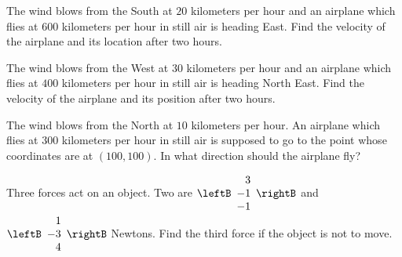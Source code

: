 \begin{enumialphparenastyle}

\begin{ex} The wind blows from the South at $20$ kilometers per hour and an
airplane which flies at $600$ kilometers per hour in still air is heading
East. Find the velocity of the airplane and its location after
two hours. \vspace{1mm}
\end{ex}

\begin{ex} The wind blows from the West at $30$ kilometers per hour and an
airplane which flies at $400$ kilometers per hour in still air is heading
North East. Find the velocity of the airplane and its position
after two hours. \vspace{1mm}
\end{ex}

\begin{ex} The wind blows from the North at $10$ kilometers per hour. An
airplane which flies at $300$ kilometers per hour in still air is supposed
to go to the point whose coordinates are at $\left( 100, 100 \right). $ In what direction should the airplane fly? \vspace{1mm}
\end{ex}

\begin{ex} Three forces act on an object. Two are $\leftB
\begin{array}{r}
3 \\
-1 \\
-1
\end{array}
\rightB $ and $\leftB
\begin{array}{r}
1 \\
-3 \\
4
\end{array}
\rightB $ Newtons. Find the third force if the object is not to move.
\vspace{1mm}
\end{ex}


\end{enumialphparenastyle}

